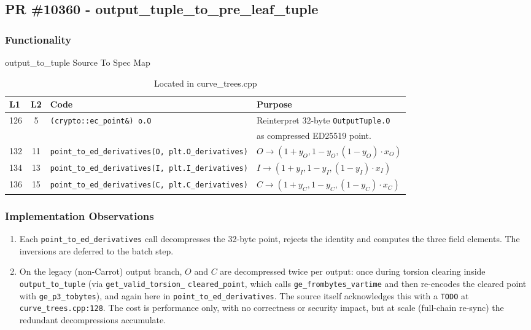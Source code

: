 \documentclass[12pt,titlepage,table]{article}
\begin{document}
\newpage

\subsection{PR \#10360 - output\_tuple\_to\_pre\_leaf\_tuple}
\subsubsection{Functionality}


\begin{table}[htbp]
\caption{output\_to\_tuple Source To Spec Map}
\begin{adjustwidth}{-1in}{-1in}
\centering
{
\begin{tabular}{| l | c | l | l |}
\hline
\textbf{L1} & \textbf{L2} & \textbf{Code} & \textbf{Purpose} \\
\hline
\hline
126 & 5 & \verb+(crypto::ec_point&) o.O+ & Reinterpret 32-byte \verb+OutputTuple.O+\\
&&&as compressed ED25519 point.\\
132 & 11 & \verb+point_to_ed_derivatives(O, plt.O_derivatives)+ & $O \rightarrow (1 + y_O, 1 - y_O, (1-y_O) \cdot x_O)$ \\
134 & 13 & \verb+point_to_ed_derivatives(I, plt.I_derivatives)+ & $I \rightarrow (1 + y_I, 1 - y_I, (1-y_I) \cdot x_I)$\\
136 & 15 & \verb+point_to_ed_derivatives(C, plt.C_derivatives)+ & $C \rightarrow (1 + y_C, 1 - y_C, (1-y_C) \cdot x_C)$\\
\hline
\end{tabular}}
\end{adjustwidth}
\caption*{Located in curve\_trees.cpp}
\end{table}
\newpage

\subsubsection{Implementation Observations}
\begin{enumerate}
    \item Each \verb+point_to_ed_derivatives+ call decompresses the 32-byte point, rejects the identity and computes the three field elements. The inversions are deferred to the batch step.
    \item On the legacy (non-Carrot) output branch, $O$ and $C$ are decompressed twice per output: once during torsion clearing inside \verb+output_to_tuple+ (via \verb+get_valid_torsion_+ \verb+cleared_point+, which calls \verb+ge_frombytes_vartime+ and then re-encodes the cleared point with \verb+ge_p3_tobytes+), and again here in \verb+point_to_ed_derivatives+.  The source itself acknowledges this with a \verb+TODO+ at \verb+curve_trees.cpp:128+.  The cost is performance only, with no correctness or security impact, but at scale (full-chain re-sync) the redundant decompressions accumulate.
\end{enumerate}
\end{document}
